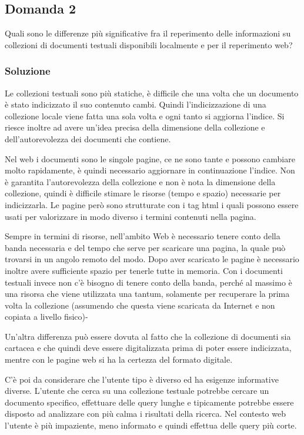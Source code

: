 \subsection{Domanda 2}

Quali sono le differenze più significative fra il reperimento delle informazioni su collezioni di documenti testuali disponibili localmente e per il reperimento web?

\subsubsection{Soluzione}

Le collezioni testuali sono più statiche, è difficile che una volta che un documento è stato indicizzato il suo contenuto cambi. Quindi l'indicizzazione di una collezione locale viene fatta una sola volta e ogni tanto si aggiorna l'indice. 
Si riesce inoltre ad avere un'idea precisa della dimensione della collezione e dell'autorevolezza dei documenti che contiene. 

Nel web i documenti sono le singole pagine, ce ne sono tante e possono cambiare molto rapidamente, è quindi necessario aggiornare in continuazione l'indice. Non è garantita l'autorevolezza della collezione e non è nota la dimensione della collezione, quindi è difficile stimare le risorse (tempo e spazio) necessarie per indicizzarla. Le pagine però sono strutturate con i tag html i quali possono essere usati per valorizzare in modo diverso i termini contenuti nella pagina.

Sempre in termini di risorse, nell'ambito Web è necessario tenere conto della banda necessaria e del tempo che serve per scaricare una pagina, la quale può trovarsi in un angolo remoto del modo. Dopo aver scaricato le pagine è necessario inoltre avere sufficiente spazio per tenerle tutte in memoria. Con i documenti testuali invece non c'è bisogno di tenere conto della banda, perché al massimo è una risorsa che viene utilizzata una tantum, solamente per recuperare la prima volta la collezione (assumendo che questa viene scaricata da Internet e non copiata a livello fisico)-

Un'altra differenza può essere dovuta al fatto che la collezione di documenti sia cartacea e che quindi deve essere digitalizzata prima di poter essere indicizzata, mentre con le pagine web si ha la certezza del formato digitale.

C'è poi da considerare che l'utente tipo è diverso ed ha esigenze informative diverse. L'utente che cerca su una collezione testuale potrebbe cercare un documento specifico, effettuare delle query lunghe e tipicamente potrebbe essere disposto ad analizzare con più calma i risultati della ricerca. Nel contesto web l'utente è più impaziente, meno informato e quindi effettua delle query più corte.

